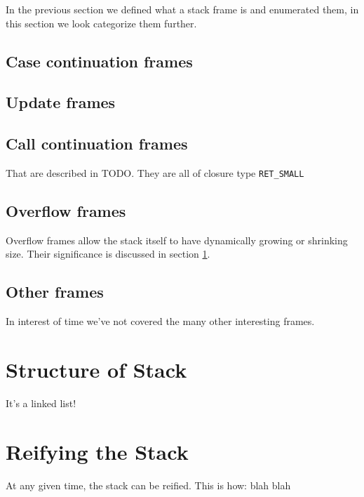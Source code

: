 In the previous section we defined what a stack frame is and enumerated
them, in this section we look categorize them further.

\subsection{Case continuation frames}

\subsection{Update frames}

\subsection{Call continuation frames} \label{sec:call_continuation_frames}

That are described in TODO. %
They are all of closure type \texttt{RET\_SMALL}

\subsection{Overflow frames}

Overflow frames allow the stack itself to have dynamically growing or
shrinking size. Their significance is discussed in section \ref{sec:structure_of_stack}.

\subsection{Other frames}

In interest of time we've not covered the many other interesting frames.

\section{Structure of Stack} \label{sec:structure_of_stack}

It's a linked list! 

\section{Reifying the Stack}

At any given time, the stack can be reified. This is how: blah blah
